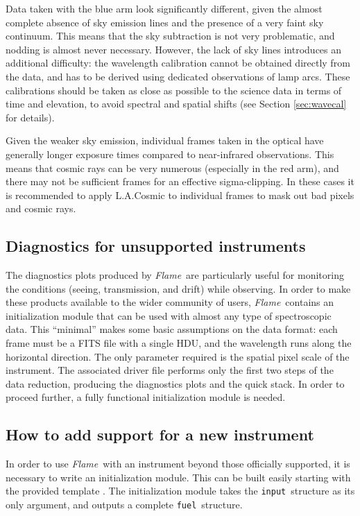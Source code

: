 \documentclass[a4paper]{article}
\newcommand{\flame}{\emph{Flame}}
\newcommand{\fuel}{\texttt{fuel}}
\newcommand{\inp}{\texttt{input}}
\begin{document}
\begin{sloppypar}
Data taken with the blue arm look significantly different, given the almost complete absence of sky emission lines and the presence of a very faint sky continuum. This means that the sky subtraction is not very problematic, and nodding is almost never necessary. However, the lack of sky lines introduces an additional difficulty: the wavelength calibration cannot be obtained directly from the data, and has to be derived using dedicated observations of lamp arcs. These calibrations should be taken as close as possible to the science data in terms of time and elevation, to avoid spectral and spatial shifts (see Section \ref{sec:wavecal} for details).

Given the weaker sky emission, individual frames taken in the optical have generally longer exposure times compared to near-infrared observations. This means that cosmic rays can be very numerous (especially in the red arm), and there may not be sufficient frames for an effective sigma-clipping. In these cases it is recommended to apply L.A.Cosmic to individual frames to mask out bad pixels and cosmic rays.


\subsection{Diagnostics for unsupported instruments}
\label{sec:minimal}

The diagnostics plots produced by \flame\ are particularly useful for monitoring the conditions (seeing, transmission, and drift) while observing. In order to make these products available to the wider community of users, \flame\ contains an initialization module that can be used with almost any type of spectroscopic data. This ``minimal'' makes some basic assumptions on the data format: each frame must be a FITS file with a single HDU, and the wavelength runs along the horizontal direction. The only parameter required is the spatial pixel scale of the instrument. The associated driver file  performs only the first two steps of the data reduction, producing the diagnostics plots and the quick stack. In order to proceed further, a fully functional initialization module is needed.

\subsection{How to add support for a new instrument}

In order to use \flame\ with an instrument beyond those officially supported, it is necessary to write an initialization module. This can be built easily starting with the provided template . The initialization module takes the \inp\ structure as its only argument, and outputs a complete \fuel\ structure.


\end{sloppypar}
\end{document}

